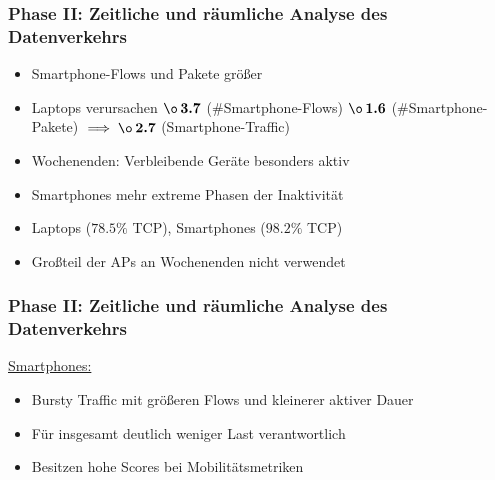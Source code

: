 \documentclass{beamer}
\begin{document}
\begin{frame}
  \frametitle{Phase II: Zeitliche und räumliche Analyse des Datenverkehrs}
  \begin{itemize}
    \item Smartphone-Flows und Pakete größer
    \item Laptops verursachen $\boldsymbol{\o \thinspace 3.7}$ (\#Smartphone-Flows)\newline
    \phantom \quad\quad\quad\quad\quad\quad\quad\quad\thinspace\thinspace\thinspace\thinspace\thinspace $\boldsymbol{\o \thinspace 1.6}$ (\#Smartphone-Pakete)\newline
    \phantom \quad\quad\quad\quad\quad\quad\thinspace\thinspace $\implies \boldsymbol{\o \thinspace 2.7}$ (Smartphone-Traffic)
    \item Wochenenden: Verbleibende Geräte besonders aktiv
    \item Smartphones mehr extreme Phasen der Inaktivität
    \item Laptops ($\boldsymbol{78.5 \%}$ TCP), Smartphones ($\boldsymbol{98.2 \%}$ TCP)
    \item Großteil der APs an Wochenenden nicht verwendet
  \end{itemize}
\end{frame}

\begin{frame}
  \frametitle{Phase II: Zeitliche und räumliche Analyse des Datenverkehrs}

  \begin{figure}[H]
    \centering
    \end{figure}

    \underline{Smartphones:}
    \begin{itemize}
      \item Bursty Traffic mit größeren Flows und kleinerer aktiver Dauer
      \item Für insgesamt deutlich weniger Last verantwortlich
      \item Besitzen hohe Scores bei Mobilitätsmetriken
    \end{itemize}
\end{frame}
\end{document}
